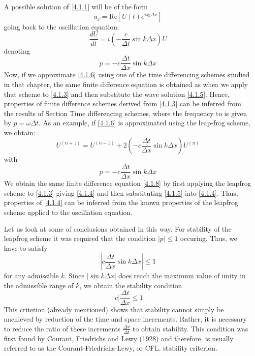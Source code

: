 A possible solution of \ref{4.1.1} will be of the form 
\begin{equation}\label{4.1.5}
    u_j=\text{Re}\left[U(t)e^{ikj\Delta x}\right]
\end{equation}
going back to the oscillation equation:
\begin{equation}\label{4.1.6}
    \frac{dU}{dt}=i\left(-\frac{c}{\Delta t}\sin k\Delta x\right)U
\end{equation}
denoting 
$$p=-c\frac{\Delta t}{\Delta x}\sin k\Delta x$$
Now, if we approximate \ref{4.1.6} using one of the time differencing schemes studied in that chapter, the same finite difference equation is obtained as when we apply that scheme to \ref{4.1.3} and then substitute the wave solution \ref{4.1.5}. Hence, properties of finite difference schemes derived from \ref{4.1.3} can be inferred from the results of Section Time differencing schemes, where the frequency to is given by $p=\omega\Delta t$.
As an example, if \ref{4.1.6} is approximated using the leap-frog scheme, we obtain:
\begin{equation}\label{4.1.8}
    U^{(n+1)}=U^{(n-1)}+2\left(-c\frac{\Delta t}{\Delta x}\sin k\Delta x\right)U^{(n)}
\end{equation}
with 
\begin{equation}\label{4.1.9}
    p=-c\frac{\Delta t}{\Delta x}\sin k\Delta x
\end{equation}
We obtain the same finite difference equation \ref{4.1.8} by first applying the leapfrog scheme to \ref{4.1.3} giving \ref{4.1.4} and then substituting \ref{4.1.5} into \ref{4.1.4}. Thus, properties of \ref{4.1.4} can be inferred from the known properties of the leapfrog scheme applied to the oscillation equation.

Let us look at some of conclusions obtained in this way. For stability of the leapfrog scheme it was required that the condition $|p|\leq 1$ occuring. Thus, we have to satisfy
\begin{equation}
    \left|c\frac{\Delta t}{\Delta x}\sin k\Delta x\right|\leq 1
\end{equation}
for any admissible $k$. Since $|\sin k\Delta x|$ does reach the maximum value of unity in the admissible range of $k$, we obtain the stability condition 
\begin{equation}\label{4.1.10}
    |c|\frac{\Delta t}{\Delta x}\leq 1
\end{equation}
This critetion (already mentioned) shows that stability cannot simply be anchieved by reduction of the time and space increments. Rather, it is necessary to reduce the ratio of these increments $\frac{\Delta x}{\Delta t}$ to obtain stability. This condition was first found by Courant, Friedrichs and Lewy (1928) and therefore, is usually referred to as the Courant-Friedrichs-Lewy, or CFL. stability criterion.

